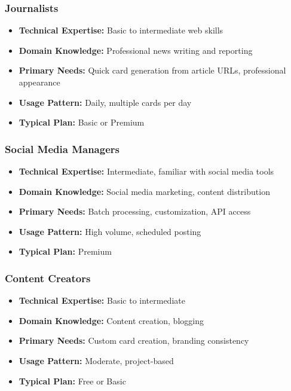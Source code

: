 \documentclass[12pt,a4paper]{article}
\begin{document}
\subsubsection{Journalists}
\begin{itemize}
    \item \textbf{Technical Expertise:} Basic to intermediate web skills
    \item \textbf{Domain Knowledge:} Professional news writing and reporting
    \item \textbf{Primary Needs:} Quick card generation from article URLs, professional appearance
    \item \textbf{Usage Pattern:} Daily, multiple cards per day
    \item \textbf{Typical Plan:} Basic or Premium
\end{itemize}

\subsubsection{Social Media Managers}
\begin{itemize}
    \item \textbf{Technical Expertise:} Intermediate, familiar with social media tools
    \item \textbf{Domain Knowledge:} Social media marketing, content distribution
    \item \textbf{Primary Needs:} Batch processing, customization, API access
    \item \textbf{Usage Pattern:} High volume, scheduled posting
    \item \textbf{Typical Plan:} Premium
\end{itemize}

\subsubsection{Content Creators}
\begin{itemize}
    \item \textbf{Technical Expertise:} Basic to intermediate
    \item \textbf{Domain Knowledge:} Content creation, blogging
    \item \textbf{Primary Needs:} Custom card creation, branding consistency
    \item \textbf{Usage Pattern:} Moderate, project-based
    \item \textbf{Typical Plan:} Free or Basic
\end{itemize}
\end{document}
